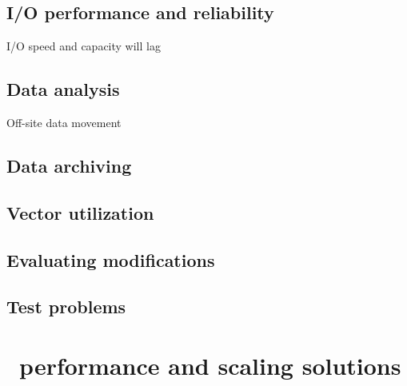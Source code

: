 \documentclass{article}
\begin{document}
\subsection{I/O performance and reliability} \label{issue:data-io}
   I/O speed and capacity will lag
\subsection{Data analysis} \label{issue:data-analyse}
   Off-site data movement
\subsection{Data archiving}\label{issue:data-archive}
\subsection{Vector utilization} \label{issue:code-vectorize}
\subsection{Evaluating modifications}\label{issue:performance-measure}
\subsection{Test problems} \label{issue:performance-tests}


\section{\enzo\ performance and scaling solutions}
\end{document}
